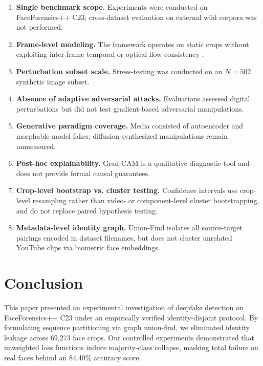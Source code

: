 \documentclass[conference]{IEEEtran}
\begin{document}
\begin{enumerate}
    \item \textbf{Single benchmark scope.} Experiments were conducted on FaceForensics++ C23; cross-dataset evaluation on external wild corpora was not performed.
    \item \textbf{Frame-level modeling.} The framework operates on static crops without exploiting inter-frame temporal or optical flow consistency \cite{haliassos2021lips}.
    \item \textbf{Perturbation subset scale.} Stress-testing was conducted on an $N=502$ synthetic image subset.
    \item \textbf{Absence of adaptive adversarial attacks.} Evaluations assessed digital perturbations but did not test gradient-based adversarial manipulations.
    \item \textbf{Generative paradigm coverage.} Media consisted of autoencoder and morphable model fakes; diffusion-synthesized manipulations remain unmeasured.
    \item \textbf{Post-hoc explainability.} Grad-CAM is a qualitative diagnostic tool and does not provide formal causal guarantees.
    \item \textbf{Crop-level bootstrap vs. cluster testing.} Confidence intervals use crop-level resampling rather than video- or component-level cluster bootstrapping, and do not replace paired hypothesis testing.
    \item \textbf{Metadata-level identity graph.} Union-Find isolates all source-target pairings encoded in dataset filenames, but does not cluster unrelated YouTube clips via biometric face embeddings.
\end{enumerate}


\section{Conclusion}
\label{sec:conclusion}

This paper presented an experimental investigation of deepfake detection on FaceForensics++ C23 under an empirically verified identity-disjoint protocol. By formulating sequence partitioning via graph union-find, we eliminated identity leakage across 69,273 face crops. Our controlled experiments demonstrated that unweighted loss functions induce majority-class collapse, masking total failure on real faces behind an 84.40\% accuracy score.
\end{document}
